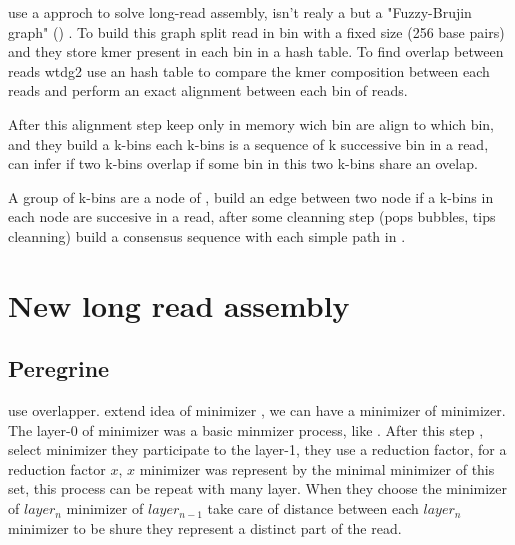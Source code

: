\documentclass[main]{subfiles}
\begin{document}
\wtdbg {} use a \DBG approch to solve long-read assembly, isn't realy a \DBG but a "Fuzzy-Brujin graph" () . To build this graph \wtdbg split read in bin with a fixed size (256 base pairs) and they store kmer present in each bin in a hash table.
To find overlap between reads wtdg2 use an hash table to compare the kmer composition between each reads and perform an exact alignment between each bin of reads. 

After this alignment step \wtdbg keep only in memory wich bin are align to which bin, and they build a k-bins each k-bins is a sequence of k successive bin in a read, \wtdbg can infer if two k-bins overlap if some bin in this two k-bins share an ovelap.

A group of k-bins are a node of , \wtdbg build an edge between two node if a k-bins in each node are succesive in a read, after some cleanning step (pops bubbles, tips cleanning) \wtdbg build a consensus sequence with each simple path in .

\section{New long read assembly}



\subsection{Peregrine}

\newcommand{\shimmer}{}

\peregrine \cite{Peregrine} use \shimmer overlapper. \shimmer extend idea of minimizer , we can have a minimizer of minimizer. 
The layer-0 of minimizer was a basic minmizer process, like \minimap. After this step \shimmer, select minimizer they participate to the layer-1, they use a reduction factor, for a reduction factor $x$, $x$ minimizer was represent by the minimal minimizer of this set, this process can be repeat with many layer. When they choose the minimizer of $layer_n$ minimizer of $layer_{n-1}$ \shimmer take care of distance between each $layer_n$ minimizer to be shure they represent a distinct part of the read. 
\end{document}
